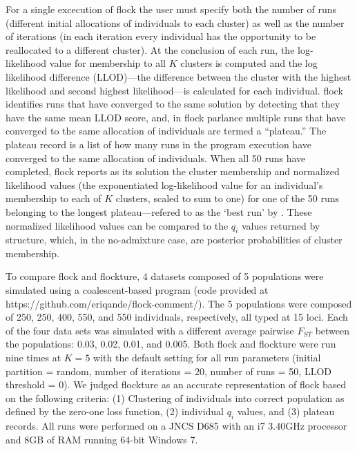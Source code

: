 For a single excecution of {\sc flock} the user must specify both the number of runs 
(different initial allocations of individuals 
to each cluster) as well as the number of iterations (in each iteration every individual 
has the opportunity to be reallocated 
to a different cluster). At the conclusion of each run, the log-likelihood value for 
membership to all $K$ clusters is computed
and the log likelihood difference (LLOD)---the difference between the 
cluster with the highest likelihood 
and second highest likelihood---is calculated for each individual. {\sc flock} 
identifies runs that have converged to the same solution by detecting 
that they have the same mean LLOD score, and, in 
{\sc flock} parlance multiple runs that have converged to the same 
allocation of individuals are termed a ``plateau.'' The plateau record is a list of 
how many runs in the program execution have converged to the same allocation
of individuals.
When all 50  runs have completed, 
{\sc flock} reports as its solution the cluster membership and 
normalized likelihood values (the exponentiated log-likelihood value for an individual's 
membership to each of $K$ clusters, scaled to sum to one) for one of the 50 runs belonging to the 
longest plateau---refered to as the `best run' by \citep{Duc&Tur2012}.
These normalized likelihood values can be compared to the $q_i$ values
returned by {\sc structure}, which, in the no-admixture case, are posterior 
probabilities of cluster membership. 
 

To compare {\sc flock} and {\sc flockture}, 4 datasets composed of 5 populations
were simulated using a coalescent-based program (code provided at 
https://github.com/eriqande/flock-comment/). The 5 populations
were composed of 250, 250, 400, 550, and 550 individuals, respectively, all typed  at 15 loci.
Each of the four data sets was simulated with a different 
average pairwise $F_{ST}$ between the populations: 0.03, 0.02, 0.01, and 0.005. 
Both {\sc flock} and {\sc flockture} were run nine times at $K=5$ with the default setting for all 
run parameters (initial partition = random, number of iterations = 20, number of runs = 50, 
LLOD threshold = 0). We judged {\sc flockture} as an accurate 
representation of {\sc flock} based on the
following criteria: (1) Clustering of individuals into correct population as
 defined by the zero-one loss function, (2) individual $q_i$ values, and (3) plateau records. 
All runs were performed on a JNCS D685 with an i7 3.40GHz processor and 8GB of 
RAM running 64-bit Windows 7. 

